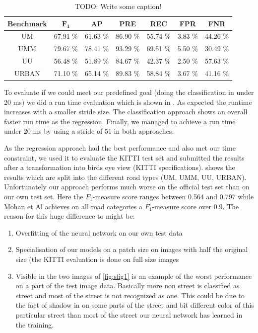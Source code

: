  \begin{table}[]
 	\begin{center}
 		\begin{tabular}{c|cccccc}
 			{\bf Benchmark} & {\bf $\mathbf{F_1}$} & {\bf AP} & {\bf PRE} & {\bf REC} & {\bf FPR} & {\bf FNR}\\ \hline
 			UM & 67.91 \% & 61.63 \% & 86.90 \% & 55.74 \% & 3.83 \% & 44.26 \%\\
 			UMM & 79.67 \% & 78.41 \% & 93.29 \% & 69.51 \% & 5.50 \% & 30.49 \%\\
 			UU  & 56.48 \% & 51.89 \% & 84.67 \% & 42.37 \% & 2.50 \% & 57.63 \%\\
 			URBAN & 71.10 \% & 65.14 \% & 89.83 \% & 58.84 \% & 3.67 \% & 41.16 \%\\
 		\end{tabular}
 	\end{center}
 	 		\caption{TODO: Write some caption!}
 	 		\label{tab:kitti}
 \end{table}







To evaluate if we could meet our predefined goal (doing the classification in under 20 ms) we did a run time evaluation which is shown in . As expected the runtime increases with a smaller stride size. The classification approach shows an overall faster run time as the regression. Finally, we managed to achieve a run time under 20 ms by using a stride of 51 in both approaches.





As the regression approach had the best performance and also met our time constraint, we used it to evaluate the KITTI test set and submitted the results after a transformation into birds eye view (KITTI specifications). shows the results which are split into the different road types (UM, UMM, UU, URBAN).
Unfortunately our approach performs much worse on the official test set than on our own test set. Here the $F_1$-measure score ranges between 0.564 and 0.797 while Mohan et Al achieves on all road categories a $F_1$-measure score over 0.9. The reason for this huge difference to might be: \\

\begin{enumerate}
  \item Overfitting of the neural network on our own test data
  \item Specialisation of our models on a patch size on images with half the original size (the KITTI evaluation is done on full size images
  \item Visible in the two images of \ref{fig:sfig1} is an example of the worst performance on a part of the test image data. Basically more non street is classified as street and most of the street is not recognized as one. This could be due to the fact of shadow in on some parts of the street and bit different color of this particular street than most of the street our neural network has learned in the training.
  \end{enumerate}

